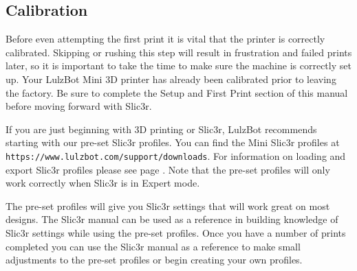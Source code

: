 
\subsection{Calibration}
\label{calibration}

Before even attempting the first print it is vital that the printer is correctly calibrated. Skipping or rushing this step will result in frustration and failed prints later, so it is important to take the time to make sure the machine is correctly set up. Your LulzBot\textsuperscript{\miniscule{\texttrademark}} Mini 3D printer has already been calibrated prior to leaving the factory. Be sure to complete the Setup and First Print section of this manual before moving forward with Slic3r.

If you are just beginning with 3D printing or Slic3r, LulzBot recommends starting with our pre-set Slic3r profiles. You can find the Mini Slic3r profiles at \texttt{https://www.lulzbot.com/support/downloads}. For information on loading and export Slic3r profiles please see page \pageref{sub:exporting_and_importing_configuration}. Note that the pre-set profiles will only work correctly when Slic3r is in Expert mode.

The pre-set profiles will give you Slic3r settings that will work great on most designs. The Slic3r manual can be used as a reference in building knowledge of Slic3r settings while using the pre-set profiles. Once you have a number of prints completed you can use the Slic3r manual as a reference to make small adjustments to the pre-set profiles or begin creating your own profiles.
